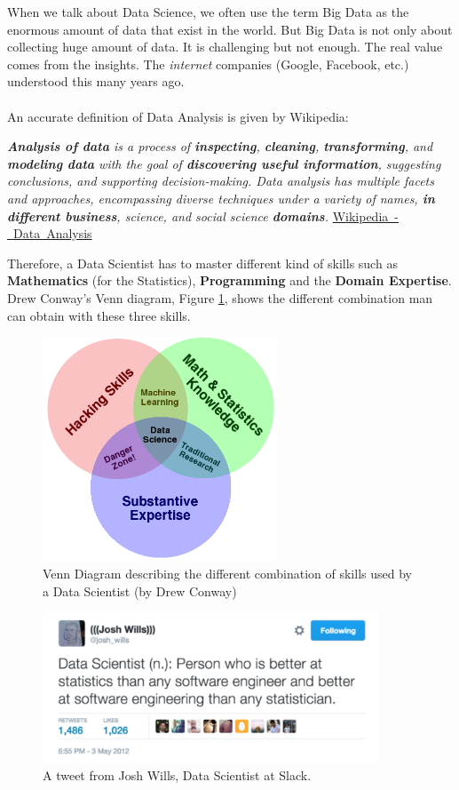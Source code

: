 \documentclass[a4paper,11pt,twoside]{article}
\newcommand*{\signed}[1]{%
  \unskip\hspace*{1em plus 1fill}%
  \nolinebreak[3]\hspace*{\fill}\mbox{#1}
}
\begin{document}
When we talk about Data Science, we often use the term Big Data as the enormous amount of data that exist in the world. But Big Data is not only about collecting huge amount of data. It is challenging but not enough. The real value comes from the insights. The {\it internet} companies (Google, Facebook, etc.) 
understood this many years ago.
\\ \\
An accurate definition of Data Analysis is given by Wikipedia:
\begin{framed}
{\it {\bf Analysis of data} is a process of {\bf inspecting}, {\bf cleaning}, {\bf transforming}, and {\bf modeling data} with the goal of {\bf discovering useful information}, suggesting conclusions, and supporting decision-making.
Data analysis has multiple facets and approaches, encompassing diverse techniques under a variety of names, {\bf in different business}, science, and social science {\bf domains}.}
\signed{\href{https://en.wikipedia.org/wiki/Data\_analysis}{Wikipedia - Data Analysis}}
\end{framed}

Therefore, a Data Scientist has to master different kind of skills such as {\bf Mathematics} (for the Statistics), {\bf Programming} and the {\bf Domain Expertise}. Drew Conway's Venn diagram, Figure \ref{img:venn}, shows the different combination man can obtain with these three skills.

\begin{figure}[H]
 \centering
 \includegraphics[width=7cm]{./pic/Data_Science_VD.png}
 \caption{\label{img:venn} Venn Diagram describing the different combination of skills used by a Data Scientist (by Drew Conway)}
\end{figure}

\begin{figure}[H]
 \centering
 \includegraphics[width=10cm]{./pic/tweet_wills.png}
 \caption{\label{img:tweet_wills} A tweet from Josh Wills, Data Scientist at Slack.}
\end{figure}
\end{document}
